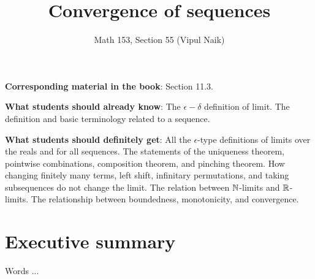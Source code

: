 \documentclass[10pt]{amsart}
\title{Convergence of sequences}
\author{Math 153, Section 55 (Vipul Naik)}
\begin{document}
\maketitle

{\bf Corresponding material in the book}: Section 11.3.

{\bf What students should already know}: The $\epsilon-\delta$
definition of limit. The definition and basic terminology related to a
sequence.

{\bf What students should definitely get}: All the $\epsilon$-type
definitions of limits over the reals and for all sequences. The
statements of the uniqueness theorem, pointwise combinations,
composition theorem, and pinching theorem. How changing finitely many
terms, left shift, infinitary permutations, and taking subsequences do
not change the limit. The relation between $\mathbb{N}$-limits and
$\mathbb{R}$-limits. The relationship between boundedness, monotonicity, and
convergence.

\section*{Executive summary}


Words ...
\end{document}
